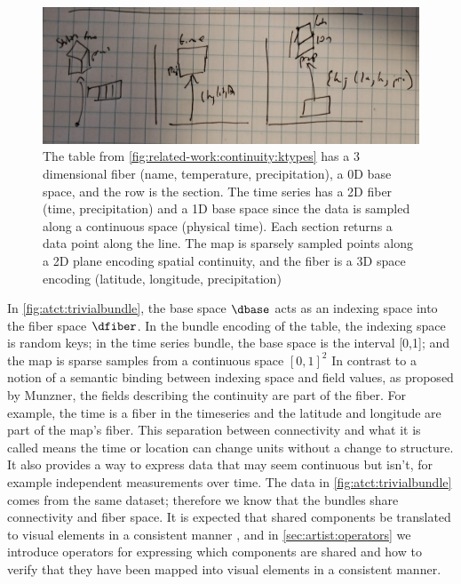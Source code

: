 \documentclass[10pt,journal,compsoc]{IEEEtran}
\theoremstyle{definition}
\theoremstyle{remark}
\begin{document}
\begin{figure}[h!]
  \includegraphics[width=\columnwidth]{dbundle.png}
  \caption{The table from \autoref{fig:related-work:continuity:ktypes} has a 3 dimensional fiber (name, temperature, precipitation), a 0D base space, and the row is the section. The time series has a 2D fiber (time, precipitation) and a 1D base space since the data is sampled along a continuous space (physical time). Each section returns a data point along the line. The map is sparsely sampled points along a 2D plane encoding spatial continuity, and the fiber is a 3D space encoding (latitude, longitude, precipitation)
    \label{fig:atct:trivialbundle}}
\end{figure}

In \autoref{fig:atct:trivialbundle}, the base space $\dbase$ acts as an indexing space into the fiber space $\dfiber$. In the bundle encoding of the table, the indexing space is random keys; in the time series bundle, the base space is the interval [0,1]; and the map is sparse samples from a continuous space $[0,1]^{2}$ In contrast to a notion of a semantic binding between indexing space and field values, as proposed by Munzner\cite{munznerVisualizationAnalysisDesign2014}, the fields describing the continuity are part of the fiber. For example, the time is a fiber in the timeseries and the latitude and longitude are part of the map's fiber. This separation between connectivity and what it is called means the time or location can change units without a change to structure. It also provides a way to express data that may seem continuous but isn't, for example independent measurements over time. The data in \autoref{fig:atct:trivialbundle} comes from the same dataset; therefore we know that the bundles share connectivity and fiber space. It is expected that shared components be translated to visual elements in a consistent manner \cite{hullmanKeeping2018}, and in \autoref{sec:artist:operators} we introduce operators for expressing which components are shared and how to verify that they have been mapped into visual elements in a consistent manner. 
\end{document}

